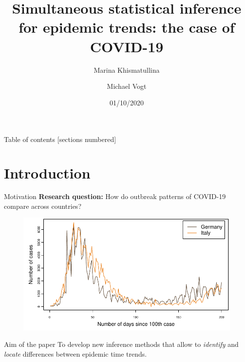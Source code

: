 \documentclass[10pt, handout]{beamer}
\title{Simultaneous statistical inference for epidemic trends: the case of COVID-19}
\date{01/10/2020}
\author{Marina Khismatullina \and Michael Vogt}
\begin{document}
\maketitle

\begin{frame}{Table of contents}
  [sections numbered]
  \tableofcontents[hideallsubsections]
\end{frame}

\section{Introduction}


\begin{frame}{Motivation}
	\textbf{Research question:}	
	How do outbreak patterns of COVID-19 compare across countries?
	\begin{figure}
    		\centering
    		\includegraphics[height=0.45\textheight]{plots/Germany_and_Italy.pdf}
    		\label{fig:DEUvsITA}
  	\end{figure}\pause
	\vspace{-3mm}
	\begin{block}{Aim of the paper}
	To develop new inference methods that allow to \textit{identify} and \textit{locate} differences between epidemic time trends.
	\end{block}
\end{frame}
\end{document}
